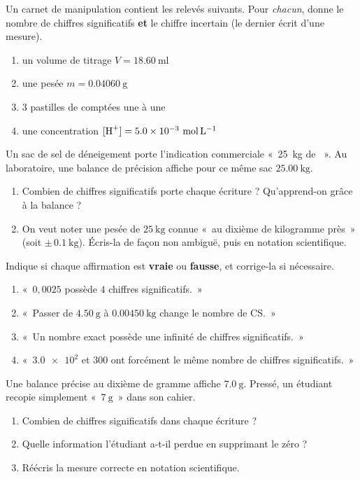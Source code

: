 \documentclass[11pt,a4paper]{article}
\begin{document}
\begin{exo}
Un carnet de manipulation contient les relevés suivants. Pour \emph{chacun}, donne le nombre de
chiffres significatifs \textbf{et} le chiffre incertain (le dernier écrit d'une mesure).
\begin{enumerate}[label=\alph*)]
  \item un volume de titrage $V=\qty{18,60}{\milli\litre}$
  \item une pesée $m=\qty{0,04060}{\gram}$
  \item $3$ pastilles de  comptées une à une
  \item une concentration $[\ce{H+}]=\num{5,0e-3}\ \si{\mol\per\litre}$
\end{enumerate}
\end{exo}

\begin{exo}
Un sac de sel de déneigement porte l'indication commerciale «~\qty{25}{\kilo\gram} de ~».
Au laboratoire, une balance de précision affiche pour ce même sac $\qty{25,00}{\kilo\gram}$.
\begin{enumerate}[label=\alph*)]
  \item Combien de chiffres significatifs porte chaque écriture ? Qu'apprend-on grâce à la balance ?
  \item On veut noter une pesée de $\qty{25}{\kilo\gram}$ connue «~au dixième de kilogramme près~»
        (soit $\pm\,\qty{0,1}{\kilo\gram}$). Écris-la de façon non ambiguë, puis en notation scientifique.
\end{enumerate}
\end{exo}

\begin{exo}
Indique si chaque affirmation est \textbf{vraie} ou \textbf{fausse}, et corrige-la si nécessaire.
\begin{enumerate}[label=\alph*)]
  \item «~$0,0025$ possède $4$ chiffres significatifs.~»
  \item «~Passer de $\qty{4,50}{\gram}$ à $\qty{0,00450}{\kilo\gram}$ change le nombre de CS.~»
  \item «~Un nombre exact possède une infinité de chiffres significatifs.~»
  \item «~$\num{3,0e2}$ et $300$ ont forcément le même nombre de chiffres significatifs.~»
\end{enumerate}
\end{exo}

\begin{exo}
Une balance précise au dixième de gramme affiche $\qty{7,0}{\gram}$. Pressé, un étudiant recopie
simplement «~$\qty{7}{\gram}$~» dans son cahier.
\begin{enumerate}[label=\alph*)]
  \item Combien de chiffres significatifs dans chaque écriture ?
  \item Quelle information l'étudiant a-t-il perdue en supprimant le zéro ?
  \item Réécris la mesure correcte en notation scientifique.
\end{enumerate}
\end{exo}
\end{document}
